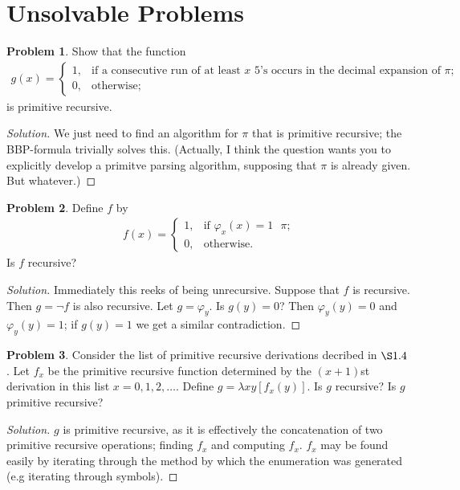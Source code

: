 \documentclass{article}
\theoremstyle{definition}
\newtheorem{prob}{Problem}[section]  %
\newenvironment{soln}
  {\begin{proof}[Solution]\setlength{\parskip}{0pt}} %
  {\end{proof}\vspace{-5pt}} %
\begin{document}
\section{Unsolvable Problems}
\begin{prob}
	Show that the function
	\begin{align*}
		g(x)=\begin{cases}
			1,&\text{if a consecutive run of at least $x$ 5's occurs in the decimal expansion of $\pi$;}\\
			0,&\text{otherwise;}
		\end{cases}
	\end{align*}
	is primitive recursive.
\end{prob}
\begin{soln}
	We just need to find an algorithm for $\pi$ that is primitive recursive; the BBP-formula trivially solves this. (Actually, I think the question wants you to explicitly develop a primitve parsing algorithm, supposing that $\pi$ is already given. But whatever.)
\end{soln}
\begin{prob}
	Define $f$ by
	\begin{align*}
		f(x)=\begin{cases}
			1,&\text{if $\varphi_x(x)=1$ $\pi$;}\\
			0,&\text{otherwise.}
		\end{cases}
	\end{align*}
	Is $f$ recursive?
\end{prob}
\begin{soln}
	Immediately this reeks of being unrecursive. Suppose that $f$ is recursive. Then $g=\neg f$ is also recursive. Let $g=\varphi_y$. Is $g(y)=0$? Then $\varphi_y(y)=0$ and $\varphi_y(y)=1$; if $g(y)=1$ we get a similar contradiction.
\end{soln}
\begin{prob}
	Consider the list of primitive recursive derivations decribed in $\S 1.4$. Let $f_x$ be the primitive recursive function determined by the $(x+1)$st derivation in this list $x=0,1,2,\dots$. Define $g=\lambda xy[f_x(y)]$. Is $g$ recursive? Is $g$ primitive recursive?
\end{prob}
\begin{soln}
	$g$ is primitive recursive, as it is effectively the concatenation of two primitive recursive operations; finding $f_x$ and computing $f_x$. $f_x$ may be found easily by iterating through the method by which the enumeration was generated (e.g iterating through symbols).
\end{soln}
\end{document}
